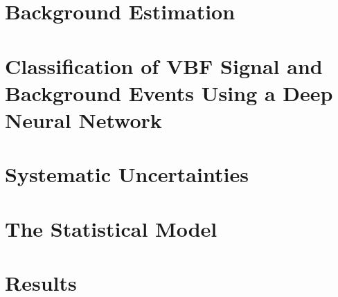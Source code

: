 \section{Background Estimation}
\label{sec:bkg-estimation}



\section{Classification of VBF Signal and Background Events Using a Deep Neural Network}
\label{sec:dnn}



\section{Systematic Uncertainties}
\label{sec:systematics}



\section{The Statistical Model}
\label{sec:stats-analysis}


\section{Results}
\label{sec:hww-results}


